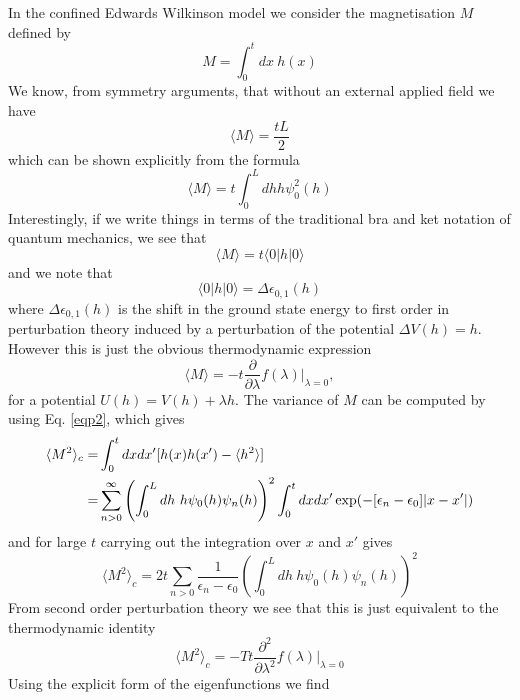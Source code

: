 In the confined Edwards Wilkinson model we consider the magnetisation $M$ defined
by 
\begin{equation}
M = \int_0^t dx\  h(x)
\end{equation}
We know, from symmetry arguments, that without an external applied field we have
\begin{equation}
\langle M\rangle = \frac{tL}{2}
\end{equation}
which  can be shown explicitly from the formula
\begin{equation}
\langle M\rangle = t\int_0^L dh  h \psi_0^2(h)
\end{equation}
Interestingly, if we write things in terms of the traditional bra and ket notation of quantum mechanics, we see that
\begin{equation}
\langle M\rangle = t \langle 0| h|0\rangle
\end{equation}
and we note that 
\begin{equation}
\langle 0| h|0\rangle = \Delta \epsilon_{0,1}(h)
\end{equation}
where $\Delta \epsilon_{0,1}(h)$ is the shift in the ground state energy to first order in perturbation theory induced by a perturbation of the potential $\Delta V(h) = h$. However this is
just the obvious thermodynamic expression
\begin{equation}
\langle M\rangle = -t\frac{\partial}{\partial \lambda}f (\lambda)|_{\lambda=0},
\end{equation}
for a potential $U(h) = V(h) + \lambda  h$.
The variance of $M$ can be computed by using Eq. \eqref{eqp2}, which gives
\begin{align}
\langle M^2\rangle_c =& \int_0^t dx dx'[ h(x)h(x')-\langle h^2\rangle] \nonumber \\
=& \sum_{n>0}^\infty
\left(\int_0^L dh\ h \psi_0(h)\psi_n(h)\right)^2\int _0^t dxdx' \exp(-[\epsilon_n-\epsilon_0]|x-x'|)
\end{align}
and for large $t$ carrying out the integration over $x$ and $x'$ gives
\begin{equation}
\langle M^2\rangle_c = 2t \sum_{n \greater 0} \frac{1}{\epsilon_n-\epsilon_0}\left(\int_0^L dh\ h \psi_0(h)\psi_n(h)\right)^2
\end{equation}
From second order perturbation theory we see that this is just equivalent to the thermodynamic
identity
\begin{equation}
\langle M^2\rangle_c = -Tt\frac{\partial^2}{\partial \lambda^2}f (\lambda)|_{\lambda=0}
\end{equation}
Using the explicit form of the eigenfunctions we find
